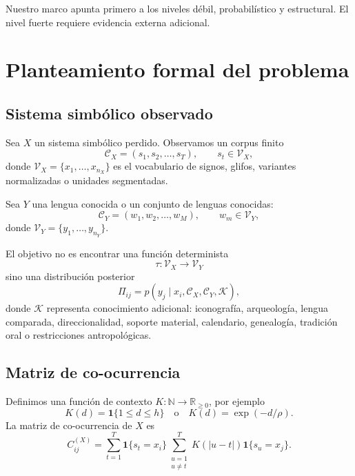\documentclass[11pt,a4paper]{article}
\newcommand{\R}{\mathbb{R}}
\newcommand{\N}{\mathbb{N}}
\newcommand{\1}{\mathbf{1}}
\newcommand{\VX}{\mathcal{V}_X}
\newcommand{\VY}{\mathcal{V}_Y}
\numberwithin{equation}{section}
\begin{document}
Nuestro marco apunta primero a los niveles débil, probabilístico y estructural. El nivel fuerte requiere evidencia externa adicional.

\section{Planteamiento formal del problema}

\subsection{Sistema simbólico observado}

Sea \(X\) un sistema simbólico perdido. Observamos un corpus finito
\begin{equation}
    \mathcal{C}_X = (s_1,s_2,\dots,s_T), 
    \qquad s_t \in \VX,
\end{equation}
donde \(\VX=\{x_1,\dots,x_{n_X}\}\) es el vocabulario de signos, glifos, variantes normalizadas o unidades segmentadas.

Sea \(Y\) una lengua conocida o un conjunto de lenguas conocidas:
\begin{equation}
    \mathcal{C}_Y = (w_1,w_2,\dots,w_M),
    \qquad w_m \in \VY,
\end{equation}
donde \(\VY=\{y_1,\dots,y_{n_Y}\}\).

El objetivo no es encontrar una función determinista
\[
    \tau:\VX\to\VY
\]
sino una distribución posterior
\begin{equation}
    \Pi_{ij}=p(y_j\mid x_i,\mathcal{C}_X,\mathcal{C}_Y,\mathcal{K}),
\end{equation}
donde \(\mathcal{K}\) representa conocimiento adicional: iconografía, arqueología, lengua comparada, direccionalidad, soporte material, calendario, genealogía, tradición oral o restricciones antropológicas.

\subsection{Matriz de co-ocurrencia}

Definimos una función de contexto \(K:\N\to\R_{\geq 0}\), por ejemplo
\[
    K(d)=\1\{1\leq d\leq h\}
    \quad\text{o}\quad
    K(d)=\exp(-d/\rho).
\]
La matriz de co-ocurrencia de \(X\) es
\begin{equation}
    C^{(X)}_{ij}
    =
    \sum_{t=1}^{T}
    \1\{s_t=x_i\}
    \sum_{\substack{u=1\\u\neq t}}^{T}
    K(|u-t|)
    \1\{s_u=x_j\}.
    \label{eq:cooc}
\end{equation}
\end{document}
